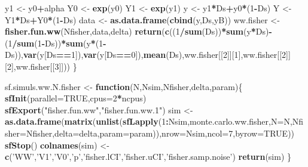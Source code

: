 \documentclass[]{book}
\newenvironment{Shaded}{\begin{snugshade}}{\end{snugshade}}
\newcommand{\ControlFlowTok}[1]{\textcolor[rgb]{0.13,0.29,0.53}{\textbf{#1}}}
\newcommand{\DataTypeTok}[1]{\textcolor[rgb]{0.13,0.29,0.53}{#1}}
\newcommand{\DecValTok}[1]{\textcolor[rgb]{0.00,0.00,0.81}{#1}}
\newcommand{\KeywordTok}[1]{\textcolor[rgb]{0.13,0.29,0.53}{\textbf{#1}}}
\newcommand{\NormalTok}[1]{#1}
\newcommand{\OperatorTok}[1]{\textcolor[rgb]{0.81,0.36,0.00}{\textbf{#1}}}
\newcommand{\OtherTok}[1]{\textcolor[rgb]{0.56,0.35,0.01}{#1}}
\newcommand{\StringTok}[1]{\textcolor[rgb]{0.31,0.60,0.02}{#1}}
\theoremstyle{definition}
\theoremstyle{definition}
\theoremstyle{definition}
\theoremstyle{remark}
\begin{document}
\begin{Shaded}
\begin{Highlighting}[]
\NormalTok{  y1 <-}\StringTok{ }\NormalTok{y0}\OperatorTok{+}\NormalTok{alpha}
\NormalTok{  Y0 <-}\StringTok{ }\KeywordTok{exp}\NormalTok{(y0)}
\NormalTok{  Y1 <-}\StringTok{ }\KeywordTok{exp}\NormalTok{(y1)}
\NormalTok{  y <-}\StringTok{ }\NormalTok{y1}\OperatorTok{*}\NormalTok{Ds}\OperatorTok{+}\NormalTok{y0}\OperatorTok{*}\NormalTok{(}\DecValTok{1}\OperatorTok{-}\NormalTok{Ds)}
\NormalTok{  Y <-}\StringTok{ }\NormalTok{Y1}\OperatorTok{*}\NormalTok{Ds}\OperatorTok{+}\NormalTok{Y0}\OperatorTok{*}\NormalTok{(}\DecValTok{1}\OperatorTok{-}\NormalTok{Ds)}
\NormalTok{  data <-}\StringTok{ }\KeywordTok{as.data.frame}\NormalTok{(}\KeywordTok{cbind}\NormalTok{(y,Ds,yB))}
\NormalTok{  ww.fisher <-}\StringTok{ }\KeywordTok{fisher.fun.ww}\NormalTok{(Nfisher,data,delta)}
  \KeywordTok{return}\NormalTok{(}\KeywordTok{c}\NormalTok{((}\DecValTok{1}\OperatorTok{/}\KeywordTok{sum}\NormalTok{(Ds))}\OperatorTok{*}\KeywordTok{sum}\NormalTok{(y}\OperatorTok{*}\NormalTok{Ds)}\OperatorTok{-}\NormalTok{(}\DecValTok{1}\OperatorTok{/}\KeywordTok{sum}\NormalTok{(}\DecValTok{1}\OperatorTok{-}\NormalTok{Ds))}\OperatorTok{*}\KeywordTok{sum}\NormalTok{(y}\OperatorTok{*}\NormalTok{(}\DecValTok{1}\OperatorTok{-}\NormalTok{Ds)),}\KeywordTok{var}\NormalTok{(y[Ds}\OperatorTok{==}\DecValTok{1}\NormalTok{]),}\KeywordTok{var}\NormalTok{(y[Ds}\OperatorTok{==}\DecValTok{0}\NormalTok{]),}\KeywordTok{mean}\NormalTok{(Ds),ww.fisher[[}\DecValTok{2}\NormalTok{]][}\DecValTok{1}\NormalTok{],ww.fisher[[}\DecValTok{2}\NormalTok{]][}\DecValTok{2}\NormalTok{],ww.fisher[[}\DecValTok{3}\NormalTok{]]))}
\NormalTok{\}}

\NormalTok{sf.simuls.ww.N.fisher <-}\StringTok{ }\ControlFlowTok{function}\NormalTok{(N,Nsim,Nfisher,delta,param)\{}
  \KeywordTok{sfInit}\NormalTok{(}\DataTypeTok{parallel=}\OtherTok{TRUE}\NormalTok{,}\DataTypeTok{cpus=}\DecValTok{2}\OperatorTok{*}\NormalTok{ncpus)}
  \KeywordTok{sfExport}\NormalTok{(}\StringTok{"fisher.fun.ww"}\NormalTok{,}\StringTok{"fisher.fun.ww.1"}\NormalTok{)}
\NormalTok{  sim <-}\StringTok{ }\KeywordTok{as.data.frame}\NormalTok{(}\KeywordTok{matrix}\NormalTok{(}\KeywordTok{unlist}\NormalTok{(}\KeywordTok{sfLapply}\NormalTok{(}\DecValTok{1}\OperatorTok{:}\NormalTok{Nsim,monte.carlo.ww.fisher,}\DataTypeTok{N=}\NormalTok{N,}\DataTypeTok{Nfisher=}\NormalTok{Nfisher,}\DataTypeTok{delta=}\NormalTok{delta,}\DataTypeTok{param=}\NormalTok{param)),}\DataTypeTok{nrow=}\NormalTok{Nsim,}\DataTypeTok{ncol=}\DecValTok{7}\NormalTok{,}\DataTypeTok{byrow=}\OtherTok{TRUE}\NormalTok{))}
  \KeywordTok{sfStop}\NormalTok{()}
  \KeywordTok{colnames}\NormalTok{(sim) <-}\StringTok{ }\KeywordTok{c}\NormalTok{(}\StringTok{'WW'}\NormalTok{,}\StringTok{'V1'}\NormalTok{,}\StringTok{'V0'}\NormalTok{,}\StringTok{'p'}\NormalTok{,}\StringTok{'fisher.lCI'}\NormalTok{,}\StringTok{'fisher.uCI'}\NormalTok{,}\StringTok{'fisher.samp.noise'}\NormalTok{)}
  \KeywordTok{return}\NormalTok{(sim)}
\NormalTok{\}}


\end{Highlighting}
\end{Shaded}
\end{document}
